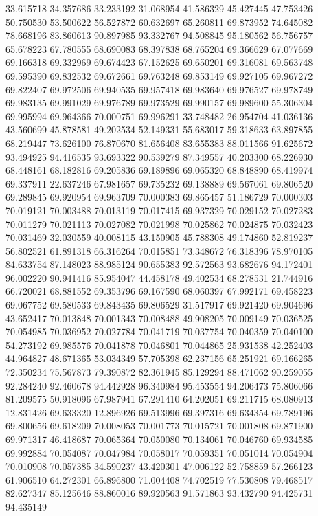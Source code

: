 33.615718
34.357686
33.233192
31.068954
41.586329
45.427445
47.753426
50.750530
53.500622
56.527872
60.632697
65.260811
69.873952
74.645082
78.668196
83.860613
90.897985
93.332767
94.508845
95.180562
56.756757
65.678223
67.780555
68.690083
68.397838
68.765204
69.366629
67.077669
69.166318
69.332969
69.674423
67.152625
69.650201
69.316081
69.563748
69.595390
69.832532
69.672661
69.763248
69.853149
69.927105
69.967272
69.822407
69.972506
69.940535
69.957418
69.983640
69.976527
69.978749
69.983135
69.991029
69.976789
69.973529
69.990157
69.989600
55.306304
69.995994
69.964366
70.000751
69.996291
33.748482
26.954704
41.036136
43.560699
45.878581
49.202534
52.149331
55.683017
59.318633
63.897855
68.219447
73.626100
76.870670
81.656408
83.655383
88.011566
91.625672
93.494925
94.416535
93.693322
90.539279
87.349557
40.203300
68.226930
68.448161
68.182816
69.205836
69.189896
69.065320
68.848890
68.419974
69.337911
22.637246
67.981657
69.735232
69.138889
69.567061
69.806520
69.289845
69.920954
69.963709
70.000383
69.865457
51.186729
70.000303
70.019121
70.003488
70.013119
70.017415
69.937329
70.029152
70.027283
70.011279
70.021113
70.027082
70.021998
70.025862
70.024875
70.032423
70.031469
32.030559
40.008115
43.150905
45.788308
49.174860
52.819237
56.802521
61.891318
66.316264
70.015851
73.348672
76.318396
78.970105
84.633754
87.148023
88.985124
90.655383
92.572563
93.682676
94.172401
96.002220
90.941416
85.954047
44.458178
49.402534
68.278531
21.744916
66.720021
68.881552
69.353796
69.167590
68.060397
67.992171
69.458223
69.067752
69.580533
69.843435
69.806529
31.517917
69.921420
69.904696
43.652417
70.013848
70.001343
70.008488
49.908205
70.009149
70.036525
70.054985
70.036952
70.027784
70.041719
70.037754
70.040359
70.040100
54.273192
69.985576
70.041878
70.046801
70.044865
25.931538
42.252403
44.964827
48.671365
53.034349
57.705398
62.237156
65.251921
69.166265
72.350234
75.567873
79.390872
82.361945
85.129294
88.471062
90.259055
92.284240
92.460678
94.442928
96.340984
95.453554
94.206473
75.806066
81.209575
50.918096
67.987941
67.291410
64.202051
69.211715
68.080913
12.831426
69.633320
12.896926
69.513996
69.397316
69.634354
69.789196
69.800656
69.618209
70.008053
70.001773
70.015721
70.001808
69.871900
69.971317
46.418687
70.065364
70.050080
70.134061
70.046760
69.934585
69.992884
70.054087
70.047984
70.058017
70.059351
70.051014
70.054904
70.010908
70.057385
34.590237
43.420301
47.006122
52.758859
57.266123
61.906510
64.272301
66.896800
71.004408
74.702519
77.530808
79.468517
82.627347
85.125646
88.860016
89.920563
91.571863
93.432790
94.425731
94.435149
